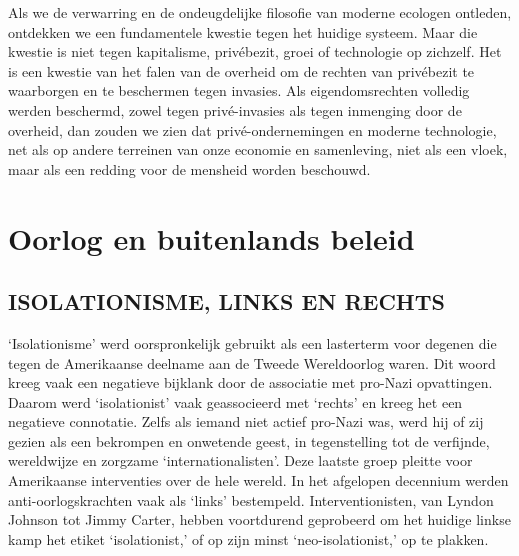 \documentclass[
  a5paper,
  smalldemyvopaper,10pt,twoside,onecolumn,openright,extrafontsizes,hidelinks]{memoir}
\begin{document}
Als we de verwarring en de ondeugdelijke filosofie van moderne ecologen
ontleden, ontdekken we een fundamentele kwestie tegen het huidige
systeem. Maar die kwestie is niet tegen kapitalisme, privébezit, groei
of technologie op zichzelf. Het is een kwestie van het falen van de
overheid om de rechten van privébezit te waarborgen en te beschermen
tegen invasies. Als eigendomsrechten volledig werden beschermd, zowel
tegen privé-invasies als tegen inmenging door de overheid, dan zouden we
zien dat privé-ondernemingen en moderne technologie, net als op andere
terreinen van onze economie en samenleving, niet als een vloek, maar als
een redding voor de mensheid worden beschouwd.


\chapter{Oorlog en buitenlands
beleid}\label{oorlog-en-buitenlands-beleid}

\section{\texorpdfstring{\textbf{ISOLATIONISME, LINKS EN
RECHTS}}{ISOLATIONISME, LINKS EN RECHTS}}\label{isolationisme-links-en-rechts}

`Isolationisme' werd oorspronkelijk gebruikt als een lasterterm voor
degenen die tegen de Amerikaanse deelname aan de Tweede Wereldoorlog
waren. Dit woord kreeg vaak een negatieve bijklank door de associatie
met pro-Nazi opvattingen. Daarom werd `isolationist' vaak geassocieerd
met `rechts' en kreeg het een negatieve connotatie. Zelfs als iemand
niet actief pro-Nazi was, werd hij of zij gezien als een bekrompen en
onwetende geest, in tegenstelling tot de verfijnde, wereldwijze en
zorgzame `internationalisten'. Deze laatste groep pleitte voor
Amerikaanse interventies over de hele wereld. In het afgelopen decennium
werden anti-oorlogskrachten vaak als `links' bestempeld.
Interventionisten, van Lyndon Johnson tot Jimmy Carter, hebben
voortdurend geprobeerd om het huidige linkse kamp het etiket
`isolationist,' of op zijn minst `neo-isolationist,' op te plakken.
\end{document}
